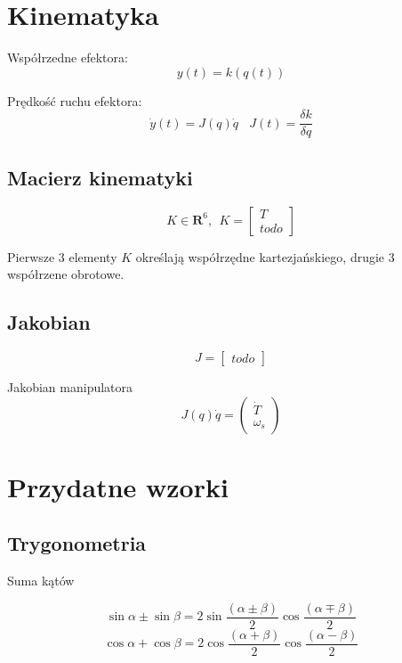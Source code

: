 \documentclass{article}
\begin{document}
\section{Kinematyka}

Współrzedne efektora:
$$
    y(t) = k( q(t) )
$$

Prędkość ruchu efektora:
$$
    \dot{y}(t) = J(q) \dot{q}
    \ \ \ \
    J(t) = \frac{\delta k}{\delta q}
$$

\subsection{Macierz kinematyki}
\Large
$$
    K \in \textbf{R}^6, \ \
    K = \begin{bmatrix}
        T \\
        todo
    \end{bmatrix}
$$
\normalsize

Pierwsze 3 elementy $K$ określają współrzędne kartezjańskiego, drugie 3 współrzene obrotowe.

\subsection{Jakobian}
\Large
$$
    J = \begin{bmatrix}
        todo
    \end{bmatrix}
$$
\normalsize

Jakobian manipulatora
\Large
$$
    J(q) \dot{q} =
    \left(
    \begin{array}{c}
        \dot{T} \\
        \omega_s
    \end{array}
    \right)
$$
\normalsize

\newpage

\section{Przydatne wzorki}
\subsection{Trygonometria}

\noindent
Suma kątów

$$  \sin{\alpha}\pm\sin{\beta}=
    2\sin{\frac{\left(\alpha\pm\beta\right)}{2}}
    \cos{\frac{\left(\alpha\mp\beta\right)}{2}} $$
$$  \cos{\alpha}+\cos{\beta}=
    2\cos{\frac{\left(\alpha+\beta\right)}{2}}
    \cos{\frac{\left(\alpha-\beta\right)}{2}} $$
\end{document}
